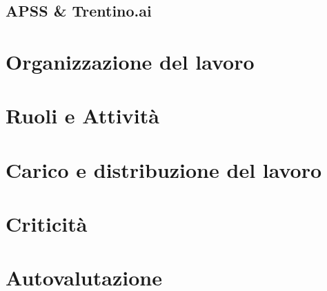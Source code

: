 \documentclass{report}
\begin{document}
\subsection{APSS \& Trentino.ai}


\section{Organizzazione del lavoro}

\section{Ruoli e Attività}

\section{Carico e distribuzione del lavoro}

\section{Criticità}

\section{Autovalutazione}



	
\end{document}

